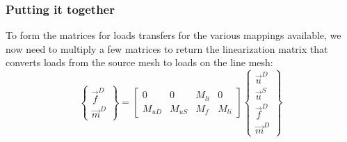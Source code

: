 \documentclass[10pt,letterpaper,oneside,notitlepage]{article}
\begin{document}
\subsubsection{Putting it together}
To form the matrices for loads transfers for the various mappings available, we now need to multiply a few matrices to return the linearization
matrix that converts loads from the source mesh to loads on the line mesh:
\begin{equation}
\label{LinearEqn}
	\left\{	\begin{matrix} \vec{f}^{D} \\ \vec{m}^{D} \end{matrix} \right\} 
=
	\begin{bmatrix}
	0 		 & 0			& M_{li} & 0   \\
	M_{uD} & M_{uS}	& M_f    & M_{li}
	\end{bmatrix}
	\left\{	\begin{matrix} \vec{u}^D \\ \vec{u}^S \\ \vec{f}^{D} \\ \vec{m}^{D} \end{matrix} \right\} 
\end{equation}
\end{document}

